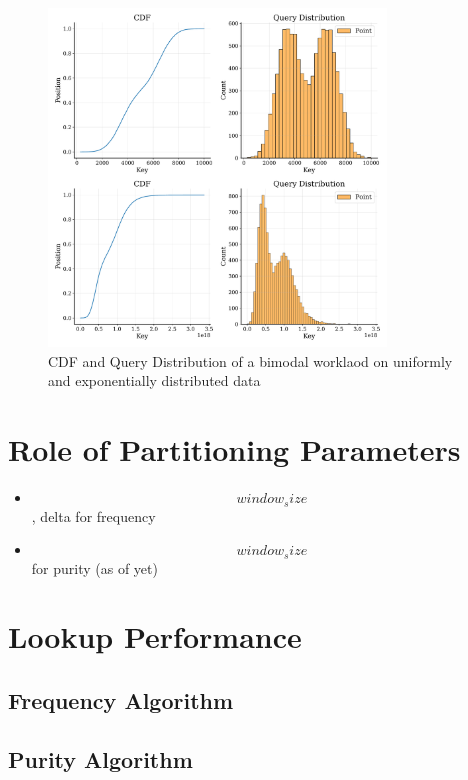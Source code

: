\begin{figure}
    \centering
    \includegraphics[width=0.8\textwidth]{figures/bimodal.pdf}
    \caption{CDF and Query Distribution of a bimodal worklaod on uniformly and exponentially distributed data}
    \label{fig:bimodal}
\end{figure}


\section{Role of Partitioning Parameters}\label{sec:respartitions}
\begin{itemize}
    \item $$window_size$$, delta for frequency
    \item $$window_size$$ for purity (as of yet)
\end{itemize}

\section{Lookup Performance}\label{sec:resperformance}

\subsection{Frequency Algorithm}

\subsection{Purity Algorithm}

